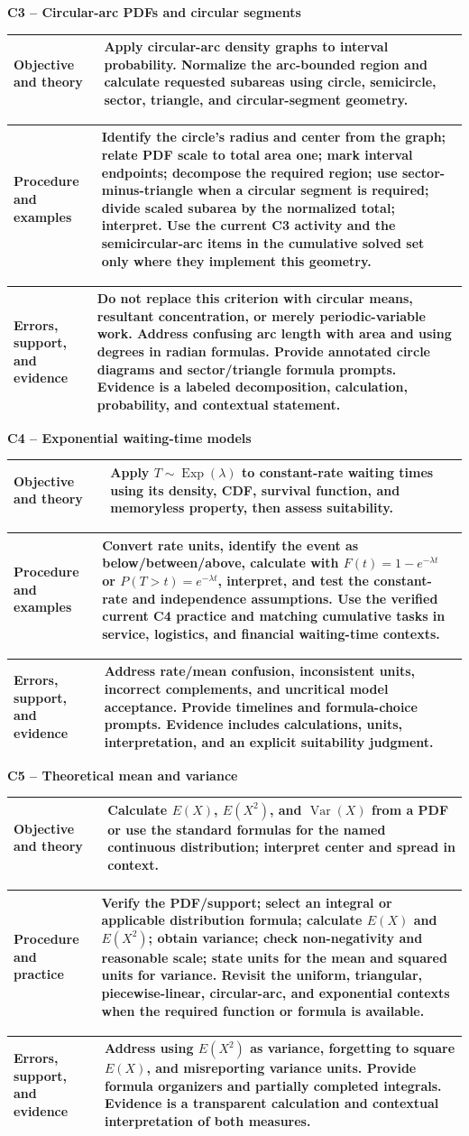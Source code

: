 \documentclass[10pt,letterpaper]{article}
\newcommand{\criterionpart}[1]{%
	\Needspace{10\baselineskip}\par\vspace{5pt}%
	\begin{tcolorbox}[
		colback=sectionblue!7,
		colframe=borderblue,
		boxrule=0.8pt,
		sharp corners,
		left=6pt,right=6pt,top=3pt,bottom=3pt,
		before skip=0pt,after skip=2pt]
		\bfseries #1
	\end{tcolorbox}%
}
\newcommand{\labelled}[2]{%
	\noindent
	\begin{tabularx}{\textwidth}{|>{\RaggedRight\arraybackslash\bfseries}p{2.12in}|>{\RaggedRight\arraybackslash}X|}
		\hline
		#1 & #2\\
		\hline
	\end{tabularx}\par\vspace{-\arrayrulewidth}%
}
\begin{document}
\criterionpart{C3 -- Circular-arc PDFs and circular segments}
\labelled{Objective and theory}{Apply circular-arc density graphs to interval probability. Normalize the arc-bounded region and calculate requested subareas using circle, semicircle, sector, triangle, and circular-segment geometry.}
\labelled{Procedure and examples}{Identify the circle's radius and center from the graph; relate PDF scale to total area one; mark interval endpoints; decompose the required region; use sector-minus-triangle when a circular segment is required; divide scaled subarea by the normalized total; interpret. Use the current C3 activity and the semicircular-arc items in the cumulative solved set only where they implement this geometry.}
\labelled{Errors, support, and evidence}{Do not replace this criterion with circular means, resultant concentration, or merely periodic-variable work. Address confusing arc length with area and using degrees in radian formulas. Provide annotated circle diagrams and sector/triangle formula prompts. Evidence is a labeled decomposition, calculation, probability, and contextual statement.}

\criterionpart{C4 -- Exponential waiting-time models}
\labelled{Objective and theory}{Apply $T\sim\operatorname{Exp}(\lambda)$ to constant-rate waiting times using its density, CDF, survival function, and memoryless property, then assess suitability.}
\labelled{Procedure and examples}{Convert rate units, identify the event as below/between/above, calculate with $F(t)=1-e^{-\lambda t}$ or $P(T>t)=e^{-\lambda t}$, interpret, and test the constant-rate and independence assumptions. Use the verified current C4 practice and matching cumulative tasks in service, logistics, and financial waiting-time contexts.}
\labelled{Errors, support, and evidence}{Address rate/mean confusion, inconsistent units, incorrect complements, and uncritical model acceptance. Provide timelines and formula-choice prompts. Evidence includes calculations, units, interpretation, and an explicit suitability judgment.}

\criterionpart{C5 -- Theoretical mean and variance}
\labelled{Objective and theory}{Calculate $E(X)$, $E(X^2)$, and $\operatorname{Var}(X)$ from a PDF or use the standard formulas for the named continuous distribution; interpret center and spread in context.}
\labelled{Procedure and practice}{Verify the PDF/support; select an integral or applicable distribution formula; calculate $E(X)$ and $E(X^2)$; obtain variance; check non-negativity and reasonable scale; state units for the mean and squared units for variance. Revisit the uniform, triangular, piecewise-linear, circular-arc, and exponential contexts when the required function or formula is available.}
\labelled{Errors, support, and evidence}{Address using $E(X^2)$ as variance, forgetting to square $E(X)$, and misreporting variance units. Provide formula organizers and partially completed integrals. Evidence is a transparent calculation and contextual interpretation of both measures.}
\end{document}
